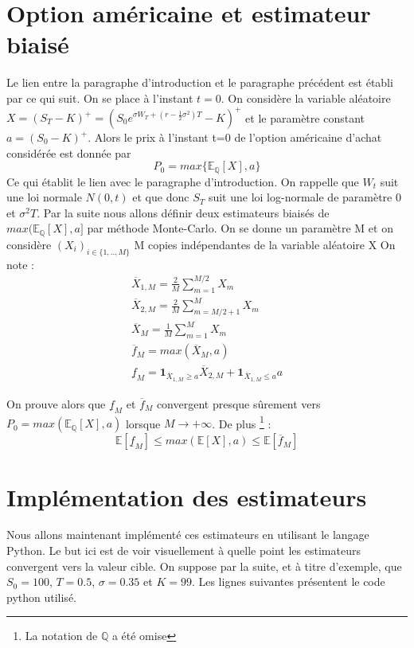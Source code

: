 \documentclass[12pt,french]{article}
\begin{document}
\section{Option américaine et estimateur biaisé}
Le lien entre la paragraphe d'introduction et le paragraphe précédent est établi par ce qui suit.
On se place à l'instant $t=0$. On considère la variable aléatoire $X = (S_T-K)^+ = ( S_0 e^{\sigma W_T+(r-\frac{1}{2} \sigma^2)T}-K)^+$ et le paramètre constant $a = (S_0-K)^+$. Alors le prix à l'instant t=0 de l'option américaine d'achat considérée est donnée par $$P_0 = max\{\mathbb{E}_{\mathbb{Q}}[X],a\}$$ Ce qui établit le lien avec le paragraphe d'introduction. \newline
On rappelle que $W_t$ suit une loi normale $N(0,t)$ et que donc 
$S_T$ suit une loi log-normale de paramètre $0$ et $\sigma^2 T$.
Par la suite nous allons définir deux estimateurs biaisés de $max(\mathbb{E}_{\mathbb{Q}}[X],a]$ par méthode Monte-Carlo. On se donne un paramètre M et on considère $ (X_i)_{i\in \{1,..,M\}} $ M copies indépendantes de la variable aléatoire X
On note :
\begin{align}
\overline{X}_{1,M} = \frac{2}{M} \sum_{m=1}^{M/2} X_m \\
\overline{X}_{2,M} = \frac{2}{M} \sum_{m=M/2+1}^{M} X_m \\
\overline{X}_{M} = \frac{1}{M} \sum_{m=1}^{M} X_m \\
\overline{f}_{M} = max(\overline{X}_{M},a) \\
\underline{f}_{M} = \textbf{1}_{\overline{X}_{1,M} \geq a} \overline{X}_{2,M} +   \textbf{1}_{\overline{X}_{1,M} \leq a} a 
 \end{align}

On prouve alors que $\underline{f}_{M}$ et $\overline{f}_{M}$ convergent presque sûrement vers $P_0 = max(\mathbb{E}_{\mathbb{Q}}[X],a) $ lorsque $ M \rightarrow + \infty $. De plus \footnote{ La notation de $\mathbb{Q}$ a été omise} : 
\begin{equation}
\mathbb{E}[\underline{f}_{M}] \leq max(\mathbb{E}[X],a) \leq \mathbb{E}[\overline{f}_{M}]
\end{equation}

\newpage
\section{Implémentation des estimateurs}
Nous allons maintenant implémenté ces estimateurs en utilisant le langage Python. Le but ici est de voir visuellement à quelle point les estimateurs convergent vers la valeur cible.
On suppose par la suite, et à titre d'exemple, que $S_0=100$, $T=0.5$, $\sigma = 0.35$ et $K=99$. 
Les lignes suivantes présentent le code python utilisé.
\end{document}

